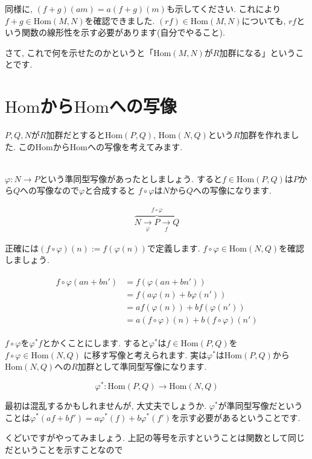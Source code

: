 \documentclass{jsarticle}
\def\Hom{\mathrm{Hom}}
\theoremstyle{definition}
\numberwithin{theorem}{section}
\begin{document}
同様に, $(f+g)(am) = a(f+g)(m)$も示してください. これにより$f+g \in \Hom(M, N)$を確認できました. $(rf) \in \Hom(M, N)$についても, 
$rf$という関数の線形性を示す必要があります(自分でやること).

さて, これで何を示せたのかというと「$\Hom(M, N)$が$R$加群になる」ということです.


\section{$\Hom$から$\Hom$への写像}
$P, Q, N$が$R$加群だとすると$\Hom(P, Q)$, $\Hom(N, Q)$という$R$加群を作れました. この$\Hom$から$\Hom$への写像を考えてみます.

\hrulefill\\

$\varphi: N \rightarrow P$という準同型写像があったとしましょう. すると$f \in \Hom(P, Q)$は$P$から$Q$への写像なので$\varphi$と合成すると
$f\circ \varphi$は$N$から$Q$への写像になります. 

\begin{eqnarray*}
\overbrace{N \xrightarrow[\varphi]{} P \xrightarrow[f]{} Q}^{\displaystyle f \circ \varphi}
\end{eqnarray*}

正確には$(f\circ \varphi)(n) := f(\varphi(n))$で定義します. $f\circ \varphi \in \Hom(N, Q)$を確認しましょう. 

\begin{eqnarray*}
\begin{aligned}
f\circ \varphi(an+bn') &= f(\varphi(an+bn'))\\
&= f(a\varphi(n) + b\varphi(n'))\\
&= af(\varphi(n)) + bf(\varphi(n'))\\
&= a(f\circ \varphi)(n) + b(f \circ \varphi)(n')
\end{aligned}
\end{eqnarray*}

$f\circ \varphi$を$\varphi^*f$とかくことにします. すると$\varphi^*$は$f \in \Hom(P, Q)$を$f\circ\varphi \in \Hom(N, Q)$
に移す写像と考えられます. 実は$\varphi^*$は$\Hom(P, Q)$から$\Hom(N, Q)$への$R$加群として準同型写像になります.

$$
\varphi^*: \Hom(P, Q) \rightarrow \Hom(N, Q)
$$

最初は混乱するかもしれませんが, 大丈夫でしょうか. $\varphi^*$が準同型写像だということは$\varphi^*(af+bf') = a\varphi^*(f) + b\varphi^*(f')$を示す必要があるということです.

くどいですがやってみましょう. 上記の等号を示すということは関数として同じだということを示すことなので
\end{document}
